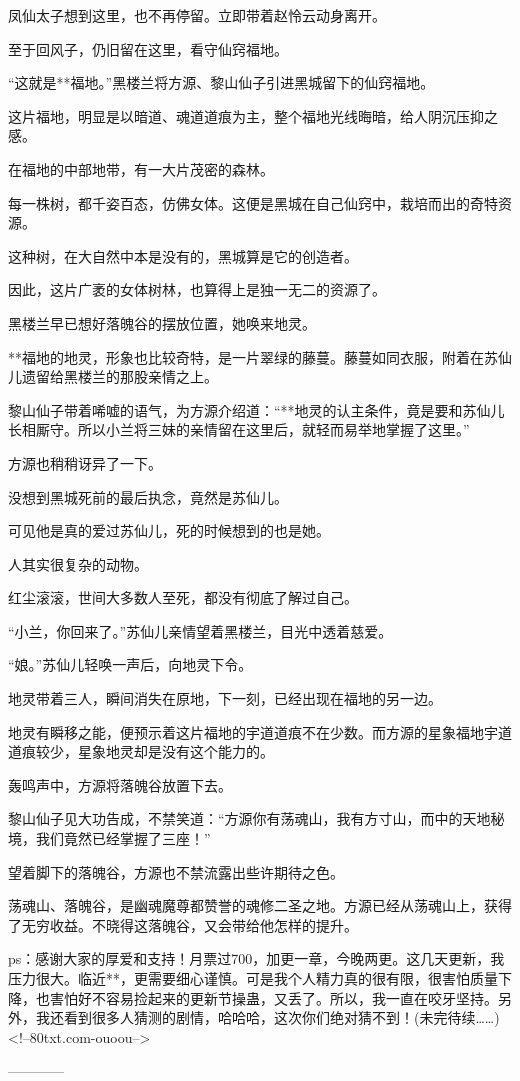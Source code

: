 \begin{this_body}
凤仙太子想到这里，也不再停留。立即带着赵怜云动身离开。

至于回风子，仍旧留在这里，看守仙窍福地。

“这就是**福地。”黑楼兰将方源、黎山仙子引进黑城留下的仙窍福地。

这片福地，明显是以暗道、魂道道痕为主，整个福地光线晦暗，给人阴沉压抑之感。

在福地的中部地带，有一大片茂密的森林。

每一株树，都千姿百态，仿佛女体。这便是黑城在自己仙窍中，栽培而出的奇特资源。

这种树，在大自然中本是没有的，黑城算是它的创造者。

因此，这片广袤的女体树林，也算得上是独一无二的资源了。

黑楼兰早已想好落魄谷的摆放位置，她唤来地灵。

**福地的地灵，形象也比较奇特，是一片翠绿的藤蔓。藤蔓如同衣服，附着在苏仙儿遗留给黑楼兰的那股亲情之上。

黎山仙子带着唏嘘的语气，为方源介绍道：“**地灵的认主条件，竟是要和苏仙儿长相厮守。所以小兰将三妹的亲情留在这里后，就轻而易举地掌握了这里。”

方源也稍稍讶异了一下。

没想到黑城死前的最后执念，竟然是苏仙儿。

可见他是真的爱过苏仙儿，死的时候想到的也是她。

人其实很复杂的动物。

红尘滚滚，世间大多数人至死，都没有彻底了解过自己。

“小兰，你回来了。”苏仙儿亲情望着黑楼兰，目光中透着慈爱。

“娘。”苏仙儿轻唤一声后，向地灵下令。

地灵带着三人，瞬间消失在原地，下一刻，已经出现在福地的另一边。

地灵有瞬移之能，便预示着这片福地的宇道道痕不在少数。而方源的星象福地宇道道痕较少，星象地灵却是没有这个能力的。

轰鸣声中，方源将落魄谷放置下去。

黎山仙子见大功告成，不禁笑道：“方源你有荡魂山，我有方寸山，而中的天地秘境，我们竟然已经掌握了三座！”

望着脚下的落魄谷，方源也不禁流露出些许期待之色。

荡魂山、落魄谷，是幽魂魔尊都赞誉的魂修二圣之地。方源已经从荡魂山上，获得了无穷收益。不晓得这落魄谷，又会带给他怎样的提升。

ps：感谢大家的厚爱和支持！月票过700，加更一章，今晚两更。这几天更新，我压力很大。临近**，更需要细心谨慎。可是我个人精力真的很有限，很害怕质量下降，也害怕好不容易捡起来的更新节操蛊，又丢了。所以，我一直在咬牙坚持。另外，我还看到很多人猜测的剧情，哈哈哈，这次你们绝对猜不到！(未完待续……)<!--80txt.com-ouoou-->

------------

\end{this_body}

